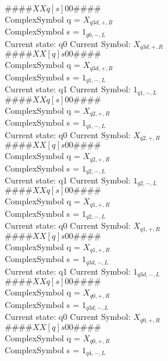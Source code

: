 \documentclass[10pt, a4paper]{article}
\begin{document}
$\# \#\# \# X X q [ s ] 0 0 \# \# \# \# $ \\
ComplexSymbol q = $X_{q3d,+,R}$ \\
ComplexSymbol s = $1_{q0,-,L}$ \\ 
 \medskip
Current state: q0	 Current Symbol: 	 $X_{q3d,+,R}$\\
$\# \#\# \# X X [ q ] s 0 0 \# \# \# \# $ \\
ComplexSymbol q = $X_{q3d,+,R}$ \\
ComplexSymbol s = $1_{q1,-,L}$ \\ 
 \medskip
Current state: q1	 Current Symbol: 	 $1_{q1,-,L}$\\
$\# \#\# \# X X q [ s ] 0 0 \# \# \# \# $ \\
ComplexSymbol q = $X_{q2,+,R}$ \\
ComplexSymbol s = $1_{q1,-,L}$ \\ 
 \medskip
Current state: q0	 Current Symbol: 	 $X_{q2,+,R}$\\
$\# \#\# \# X X [ q ] s 0 0 \# \# \# \# $ \\
ComplexSymbol q = $X_{q2,+,R}$ \\
ComplexSymbol s = $1_{q2,-,L}$ \\ 
 \medskip
Current state: q1	 Current Symbol: 	 $1_{q2,-,L}$\\
$\# \#\# \# X X q [ s ] 0 0 \# \# \# \# $ \\
ComplexSymbol q = $X_{q1,+,R}$ \\
ComplexSymbol s = $1_{q2,-,L}$ \\ 
 \medskip
Current state: q0	 Current Symbol: 	 $X_{q1,+,R}$\\
$\# \#\# \# X X [ q ] s 0 0 \# \# \# \# $ \\
ComplexSymbol q = $X_{q1,+,R}$ \\
ComplexSymbol s = $1_{q3d,-,L}$ \\ 
 \medskip
Current state: q1	 Current Symbol: 	 $1_{q3d,-,L}$\\
$\# \#\# \# X X q [ s ] 0 0 \# \# \# \# $ \\
ComplexSymbol q = $X_{q0,+,R}$ \\
ComplexSymbol s = $1_{q3d,-,L}$ \\ 
 \medskip
Current state: q0	 Current Symbol: 	 $X_{q0,+,R}$\\
$\# \#\# \# X X [ q ] s 0 0 \# \# \# \# $ \\
ComplexSymbol q = $X_{q0,+,R}$ \\
ComplexSymbol s = $1_{q4,-,L}$ \\ 
 \medskip
\end{document}

